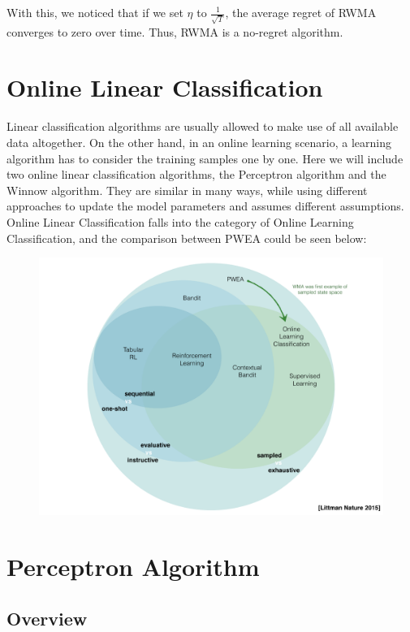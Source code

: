 \documentclass[11pt]{article}
\begin{document}
With this, we noticed that if we set $\eta$ to $\frac{1}{\sqrt{T}}$, the average regret of RWMA converges to zero over time. Thus, RWMA is a no-regret algorithm.


\section{Online Linear Classification}

Linear classification algorithms are usually allowed to make use of all available data altogether. On the other hand, in an online learning scenario, a learning algorithm has to consider the training samples one by one. Here we will include two online linear classification algorithms, the Perceptron algorithm and the Winnow algorithm. They are similar in many ways, while using different approaches to update the model parameters and assumes different assumptions. Online Linear Classification falls into the category of Online Learning Classification, and the comparison between PWEA could be seen below:


\begin{figure}[H]
    \centering
    \includegraphics[width=.6\linewidth]{img/diagram.png}
\end{figure}


\section{Perceptron Algorithm}

\subsection{Overview}
\normalfont
\end{document}
